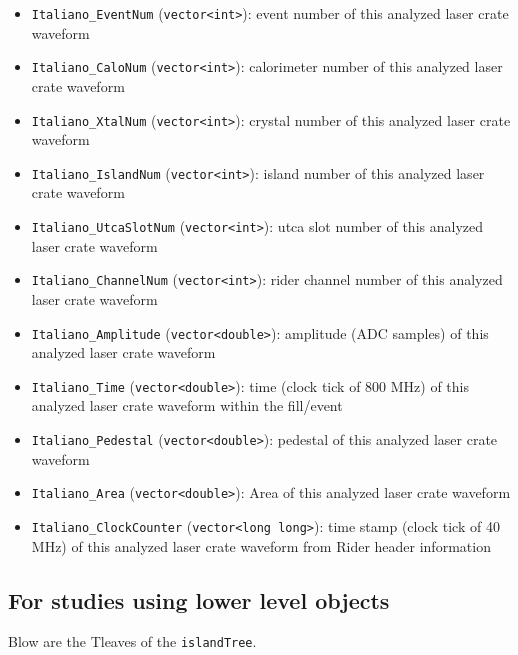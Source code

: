 \begin{itemize}
\item \verb+Italiano_EventNum+ (\verb+vector<int>+): event number of this analyzed laser crate waveform
\item \verb+Italiano_CaloNum+ (\verb+vector<int>+): calorimeter number of this analyzed laser crate waveform
\item \verb+Italiano_XtalNum+ (\verb+vector<int>+): crystal number of this analyzed laser crate waveform
\item \verb+Italiano_IslandNum+ (\verb+vector<int>+): island number of this analyzed laser crate waveform
\item \verb+Italiano_UtcaSlotNum+ (\verb+vector<int>+): utca slot number of this analyzed laser crate waveform
\item \verb+Italiano_ChannelNum+ (\verb+vector<int>+): rider channel number of this analyzed laser crate waveform
\item \verb+Italiano_Amplitude+ (\verb+vector<double>+): amplitude (ADC samples) of this analyzed laser crate waveform
\item \verb+Italiano_Time+ (\verb+vector<double>+): time (clock tick of 800 MHz) of this analyzed laser crate waveform within the fill/event
\item \verb+Italiano_Pedestal+ (\verb+vector<double>+): pedestal of this analyzed laser crate waveform
\item \verb+Italiano_Area+ (\verb+vector<double>+): Area of this analyzed laser crate waveform
\item \verb+Italiano_ClockCounter+ (\verb+vector<long long>+): time stamp (clock tick of 40 MHz) of this analyzed laser crate waveform from Rider header information
\end{itemize}

\subsection*{For studies using lower level objects}
Blow are the Tleaves of the \verb+islandTree+.

